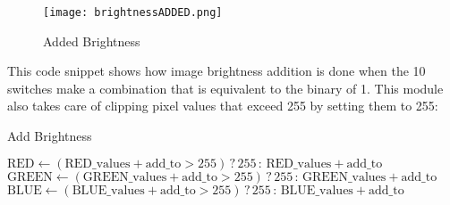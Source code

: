 \begin{figure}[H]
	\centering
	\texttt{[image: brightnessADDED.png]}
	\caption{Added Brightness}
	\label{fig:imageBrighter}  
\end{figure}

\par This code snippet shows how image brightness addition is done when the 10 switches make a combination that is equivalent to the binary of 1. This module also takes care of clipping pixel values that exceed 255 by setting them to 255: \newline

\begin{algorithm}[H]
	\caption{Add Brightness \cite{fpgaipvgarepo}}
	\begin{algorithmic}[1]
		\State {}
		\State $\text{RED} \gets (\text{RED\_values} + \text{add\_to} > 255) \, ? \, 255 \, : \, \text{RED\_values} + \text{add\_to}$
		\State $\text{GREEN} \gets (\text{GREEN\_values} + \text{add\_to} > 255) \, ? \, 255 \, : \, \text{GREEN\_values} + \text{add\_to}$
		\State $\text{BLUE} \gets (\text{BLUE\_values} + \text{add\_to} > 255) \, ? \, 255 \, : \, \text{BLUE\_values} + \text{add\_to}$
		\EndIf
	\end{algorithmic}
\end{algorithm}

